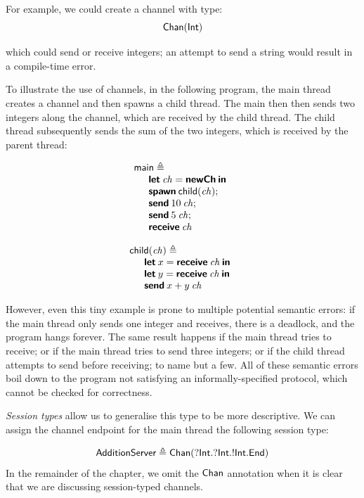\documentclass[
graybox,
envcountchap
]{svmult}
\begin{document}
\begin{bibunit}
  For example, we could create a channel with type:
  \[
    \mathsf{Chan}(\mathsf{Int})
  \]


  which could send or receive integers; an attempt to send a string would result
  in a compile-time error.

  To illustrate the use of channels, in the following program, the
  main thread creates a channel and then spawns a child thread. The main
  then then sends two integers along the channel, which are received by the
  child thread. The child thread subsequently sends the sum of the two integers,
  which is received by the parent thread:

  \begin{minipage}{0.45\textwidth}
  \[
    \begin{array}{l}
    \mathsf{main} \triangleq \\
    \quad
      \begin{array}{l}
        \textbf{\textsf{let}} \: \mathit{ch} = \textbf{\textsf{newCh}} \: \textbf{\textsf{in}} \\
        \textbf{\textsf{spawn}} \: \mathsf{child}(\mathit{ch}); \\
        \textbf{\textsf{send}} \: 10 \: \mathit{ch}; \\
        \textbf{\textsf{send}} \: 5 \: \mathit{ch}; \\
        \textbf{\textsf{receive}} \: \mathit{ch}
      \end{array}
    \end{array}
  \]
\end{minipage}
\hfill
\begin{minipage}{0.45\textwidth}
  \[
    \begin{array}{l}
    \mathsf{child}(\mathit{ch}) \triangleq \\
    \quad
      \begin{array}{l}
      \textbf{\textsf{let}} \: x = \textbf{\textsf{receive}} \: \mathit{ch} \: \textbf{\textsf{in}} \\
      \textbf{\textsf{let}} \: y = \textbf{\textsf{receive}} \: \mathit{ch} \: \textbf{\textsf{in}} \\
      \textbf{\textsf{send}} \: x + y \: \mathit{ch}
      \end{array}
    \end{array}
  \]
\end{minipage}


  However, even this tiny example is prone to multiple potential semantic errors: if the
  main thread only sends one integer and receives, there is a deadlock, and the
  program hangs forever. The same result happens if the main thread tries to
  receive; or if the main thread tries to send three integers; or if the child
  thread attempts to send before receiving; to name but a few. All of these
  semantic errors boil down to the program not satisfying an
  informally-specified protocol, which cannot be checked for correctness.

  \emph{Session types} allow us to generalise this type to be more descriptive.
  We can assign the channel endpoint for the main thread the following session
  type:

  \[
    \mathsf{AdditionServer} \triangleq
    \mathsf{Chan}({?}\mathsf{Int}.{?}\mathsf{Int}.{!}\mathsf{Int}.\mathsf{End})
  \]
  In the remainder of the chapter, we omit the $\mathsf{Chan}$ annotation when it
  is clear that we are discussing session-typed channels.


\end{bibunit}
\end{document}

